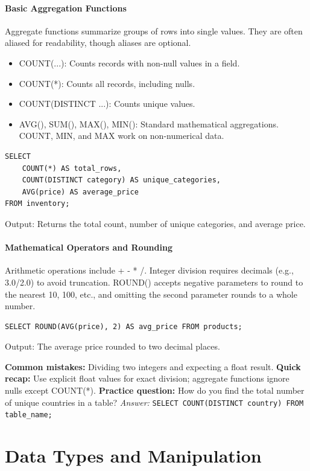 \documentclass[12pt, a4paper]{article}
\begin{document}
\subsection{Basic Aggregation Functions}
Aggregate functions summarize groups of rows into single values. They are often aliased for readability, though aliases are optional.
\begin{itemize}
    \item COUNT(...): Counts records with non-null values in a field.
    \item COUNT(*): Counts all records, including nulls.
    \item COUNT(DISTINCT ...): Counts unique values.
    \item AVG(), SUM(), MAX(), MIN(): Standard mathematical aggregations. COUNT, MIN, and MAX work on non-numerical data.
\end{itemize}

\begin{verbatim}
SELECT 
    COUNT(*) AS total_rows, 
    COUNT(DISTINCT category) AS unique_categories,
    AVG(price) AS average_price
FROM inventory;
\end{verbatim}
Output: Returns the total count, number of unique categories, and average price.

\subsection{Mathematical Operators and Rounding}
Arithmetic operations include + - * /. Integer division requires decimals (e.g., 3.0/2.0) to avoid truncation. ROUND() accepts negative parameters to round to the nearest 10, 100, etc., and omitting the second parameter rounds to a whole number.

\begin{verbatim}
SELECT ROUND(AVG(price), 2) AS avg_price FROM products;
\end{verbatim}
Output: The average price rounded to two decimal places.

\textbf{Common mistakes:} Dividing two integers and expecting a float result.
\textbf{Quick recap:} Use explicit float values for exact division; aggregate functions ignore nulls except COUNT(*).
\textbf{Practice question:} How do you find the total number of unique countries in a table?
\textit{Answer:} \texttt{SELECT COUNT(DISTINCT country) FROM table\_name;}

\part{Data Types and Manipulation}
\end{document}

